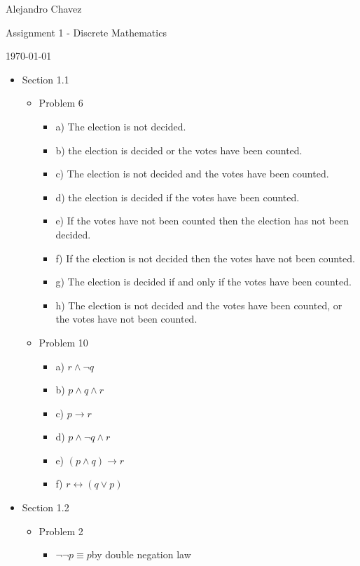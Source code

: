 \documentclass[10pt,a4paper]{article}
\begin{document}
\hfill Alejandro Chavez

\hfill Assignment 1 - Discrete Mathematics

\hfill \today\\

\begin{itemize}
  \item Section 1.1
  \begin{itemize}
    \item Problem 6
    \begin{itemize}
      \item a) The election is not decided.
      \item b) the election is decided or the votes have been counted.
      \item c) The election is not decided and the votes have been counted.
      \item d) the election is decided if the votes have been counted.
      \item e) If the votes have not been counted then the election has not been decided.
      \item f) If the election is not decided then the votes have not been counted.
      \item g) The election is decided if and only if the votes have been counted.
      \item h) The election is not decided and the votes have been counted, or the votes have not been counted.
    \end{itemize}
    \item Problem 10
    \begin{itemize}
      \item a) $r\land \lnot q$
      \item b) $p\land q\land r$
      \item c) $p\to r$
      \item d) $p\land \lnot q\land r$
      \item e) $(p\land q)\to r$
      \item f) $r\leftrightarrow (q\lor p)$
    \end{itemize}
  \end{itemize}
  \item Section 1.2
  \begin{itemize}
    \item Problem 2
    \begin{itemize}
      \item $\lnot \lnot p\equiv p$\hfill by double negation law
    \end{itemize}

\end{itemize}
\end{itemize}
\end{document}

